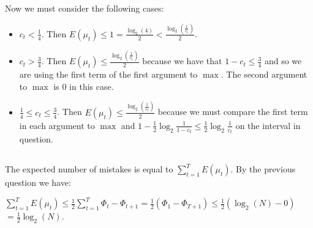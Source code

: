 \documentclass[]{article}
\begin{document}
\noindent Now we must consider the following cases:
\begin{itemize}
	\item $c_t < \frac{1}{4}$. Then $E(\mu_t) \le 1 = \frac{\log_2(4)}{2} < \frac{\log_2(\frac{1}{c_t})}{2}$.
	\item $c_t > \frac{3}{4}$. Then $E(\mu_t) \le \frac{\log_2(\frac{1}{c_t})}{2}$ because we have that $1 - c_t \le \frac{3}{4}$ and so we are using the first term of the first argument to $\max$. The second argument to $\max$ is 0 in this case.
	\item $\frac{1}{4} \le c_t \le \frac{3}{4}$. Then $E(\mu_t) \le \frac{\log_2(\frac{1}{c_t})}{2}$ because we must compare the first term in each argument to $\max$ and $1 - \frac{1}{2} \log_2 \frac{1}{1-c_t} \le \frac{1}{2} \log_2 \frac{1}{c_t}$ on the interval in question.
	
\end{itemize}

\subsection{}

The expected number of mistakes is equal to $\sum_{t=1}^{T} E(\mu_t)$. By the previous question we have:

$\sum_{t=1}^{T} E(\mu_t) \le \frac{1}{2} \sum_{t=1}^{T} \Phi_t - \Phi_{t+1} = \frac{1}{2} (\Phi_1 - \Phi_{T+1}) \le \frac{1}{2}(\log_2(N) - 0)$\\

$ = \frac{1}{2} \log_2(N)$.

\subsection{}
\end{document}
